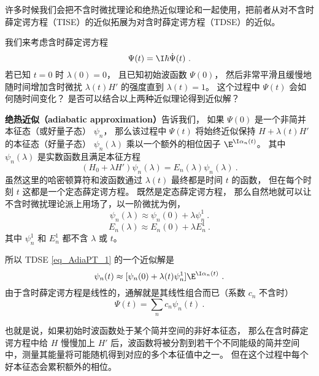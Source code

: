 

\begin{issues}
\issueDraft
{}
\end{issues}


许多时候我们会把不含时微扰理论和绝热近似理论和一起使用，把前者从对不含时薛定谔方程（TISE）的近似拓展为对含时薛定谔方程（TDSE）的近似。

我们来考虑含时薛定谔方程
\begin{equation}
[H_0 + \lambda(t)H']\Psi(t) = \I\hbar\dot \Psi(t)~.
\end{equation}
若已知 $t=0$ 时 $\lambda(0) = 0$， 且已知初始波函数 $\Psi(0)$， 然后非常平滑且缓慢地随时间增加含时微扰 $\lambda(t) H'$ 的强度直到 $\lambda(t)=1$。 这个过程中 $\Psi(t)$ 会如何随时间变化？ 是否可以结合以上两种近似理论得到近似解？

\textbf{绝热近似（adiabatic approximation）}告诉我们， 如果 $\Psi(0)$ 是一个非简并本征态（或好量子态） $\psi_n$， 那么该过程中 $\Psi(t)$ 将始终近似保持 $H+\lambda(t) H'$ 的本征态（好量子态） $\psi_n(\lambda)$ 乘以一个额外的相位因子 $\E^{\I\alpha_n(t)}$。 其中 $\psi_n(\lambda)$ 是实数函数且满足本征方程
\begin{equation}\label{eq_AdiaPT_1}
(H_0 + \lambda H')\psi_n(\lambda) = E_n(\lambda)\psi_n(\lambda)~.
\end{equation}
虽然这里的哈密顿算符和波函数通过 $\lambda(t)$ 最终都是时间 $t$ 的函数， 但在每个时刻 $t$ 这都是一个定态薛定谔方程。 既然是定态薛定谔方程， 那么自然地就可以让不含时微扰理论派上用场了，以一阶微扰为例，
\begin{equation}
\psi_n(\lambda) \approx \psi_n(0) + \lambda\psi_n^1~.
\end{equation}
\begin{equation}
E_n(\lambda) \approx E_n(0) + \lambda E_n^1~.
\end{equation}
其中 $\psi_n^1$ 和 $E_n^1$ 都不含 $\lambda$ 或 $t$。

所以 TDSE \autoref{eq_AdiaPT_1} 的一个近似解是
\begin{equation}
\psi_n(t) \approx [\psi_n(0) + \lambda(t)\psi_n^1] \E^{\I\alpha_n(t)}~.
\end{equation}
由于含时薛定谔方程是线性的，通解就是其线性组合而已（系数 $c_n$ 不含时）
\begin{equation}
\Psi(t) = \sum_n c_n \psi_n(t)~.
\end{equation}

也就是说，如果初始时波函数处于某个简并空间的非好本征态， 那么在含时薛定谔方程中给 $H$ 慢慢加上 $H'$ 后，波函数将被分割到若干个不同能级的简并空间中，测量其能量将可能随机得到对应的多个本征值中之一。 但在这个过程中每个好本征态会累积额外的相位。
